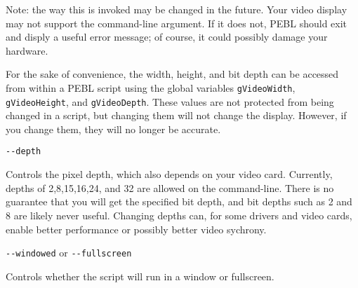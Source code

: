 \begin{description}
Note: the way this is invoked may be changed in the
future.  Your video display may not support the
command-line argument.  If it does not, PEBL should exit
and disply a useful error message; of course, it could
possibly damage your hardware. 

For the sake of convenience, the width, height, and bit depth can be accessed from within
a PEBL script using the global variables \texttt{gVideoWidth}, \texttt{gVideoHeight}, and \texttt{gVideoDepth}.  These values are not protected from being changed in a script, but changing them will not change the display. However, if you change them, they will no longer be accurate.
  

\item
\begin{verbatim}
--depth
\end{verbatim}
  Controls the pixel depth, which also  depends on your video card.
  Currently, depths of 2,8,15,16,24, and 32 are allowed on the
  command-line.  There is no guarantee that you will get the
  specified bit depth, and bit depths such as 2 and 8 are
  likely never useful.  Changing depths can, for
  some drivers and video cards, enable better performance or
  possibly better video sychrony.

\item
\verb+--windowed+ or \verb+--fullscreen+

Controls whether the script will run in a window or fullscreen.  
\end{description}







